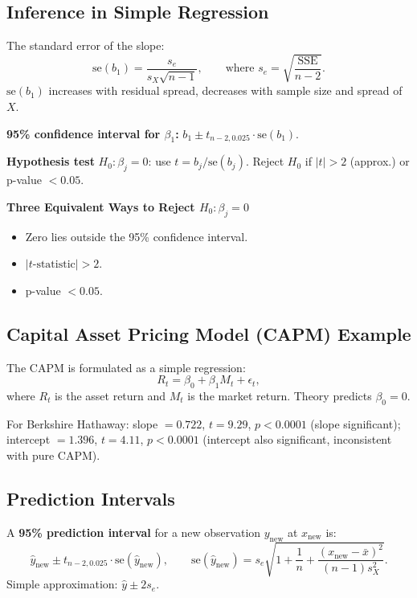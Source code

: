 \documentclass[12pt, a4paper]{article}
\begin{document}
\subsection{Inference in Simple Regression}

The standard error of the slope:
\[
  \text{se}(b_1) = \frac{s_e}{s_X\sqrt{n-1}},
  \qquad\text{where } s_e = \sqrt{\frac{\text{SSE}}{n-2}}.
\]
$\text{se}(b_1)$ increases with residual spread, decreases with sample size and spread of $X$.

\textbf{95\% confidence interval for $\beta_1$:} $b_1 \pm t_{n-2,0.025} \cdot \text{se}(b_1)$.

\textbf{Hypothesis test} $H_0: \beta_j = 0$: use $t = b_j/\text{se}(b_j)$. Reject $H_0$ if $|t| > 2$ (approx.) or p-value $< 0.05$.

\begin{keybox}
\noindent\textbf{Three Equivalent Ways to Reject $H_0:\beta_j=0$}\par\smallskip
\begin{itemize}
  \item Zero lies outside the 95\% confidence interval.
  \item $|t\text{-statistic}| > 2$.
  \item p-value $< 0.05$.
\end{itemize}
\end{keybox}

\subsection{Capital Asset Pricing Model (CAPM) Example}

The CAPM is formulated as a simple regression:
\[
  R_t = \beta_0 + \beta_1 M_t + \epsilon_t,
\]
where $R_t$ is the asset return and $M_t$ is the market return. Theory predicts $\beta_0 = 0$.

For Berkshire Hathaway: slope $= 0.722$, $t = 9.29$, $p < 0.0001$ (slope significant); intercept $= 1.396$, $t = 4.11$, $p < 0.0001$ (intercept also significant, inconsistent with pure CAPM).

\subsection{Prediction Intervals}

A \textbf{95\% prediction interval} for a new observation $y_\text{new}$ at $x_\text{new}$ is:
\[
  \hat{y}_\text{new} \pm t_{n-2,0.025}\cdot \text{se}(\hat{y}_\text{new}),
  \qquad
  \text{se}(\hat{y}_\text{new}) = s_e\sqrt{1 + \frac{1}{n} + \frac{(x_\text{new}-\bar{x})^2}{(n-1)s_X^2}}.
\]
Simple approximation: $\hat{y} \pm 2s_e$.
\end{document}
